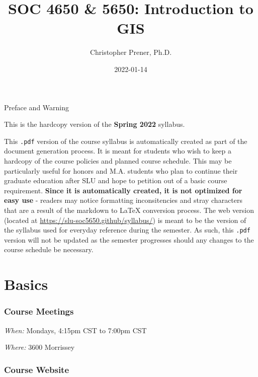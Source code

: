 \documentclass[
]{book}
\title{SOC 4650 \& 5650: Introduction to GIS}
\author{Christopher Prener, Ph.D.}
\date{2022-01-14}
\begin{document}
\maketitle

\begin{center}
{\huge Preface and Warning} \\
\end{center}
\vspace{5mm}
This is the hardcopy version of the \textbf{Spring 2022} syllabus.
\vspace{5mm}
\par \noindent This \texttt{.pdf} version of the course syllabus is automatically created as part of the document generation process. It is meant for students who wish to keep a hardcopy of the course policies and planned course schedule. This may be particularly useful for honors and M.A. students who plan to continue their graduate education after SLU and hope to petition out of a basic course requirement. \textbf{Since it is automatically created, it is not optimized for easy use} - readers may notice formatting inconsitencies and stray characters that are a result of the markdown to \LaTeX{} conversion process. The web version (located at \href{https://slu-soc5650.github/syllabus/}{https://slu-soc5650.github/syllabus/}) is meant to be the version of the syllabus used for everyday reference during the semester. As such, this \texttt{.pdf} version will not be updated as the semester progresses should any changes to the course schedule be necessary.

\hypertarget{basics}{%
\chapter*{Basics}\label{basics}}

\hypertarget{course-meetings}{%
\subsection*{Course Meetings}\label{course-meetings}}

\emph{When:} Mondays, 4:15pm CST to 7:00pm CST

\emph{Where:} 3600 Morrissey

\hypertarget{course-website}{%
\subsection*{Course Website}\label{course-website}}
\end{document}
